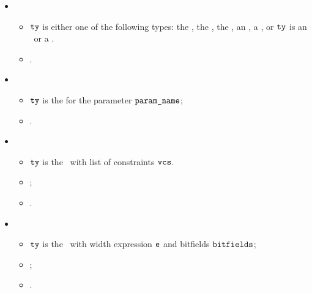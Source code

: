 \ProseParagraph
\OneApplies
\begin{itemize}
  \item {}
  \begin{itemize}
    \item $\tty$ is either one of the following types: the \realtypeterm, the \stringtypeterm,
          the \booleantypeterm, an \enumerationtypeterm, a \namedtypeterm,
          or $\tty$ is an \unconstrainedintegertypeterm\ or a
          \pendingconstrainedintegertypeterm.
    \item \Proseeqdef{$\newty$}{$\tty$}.
  \end{itemize}

  \item {}
  \begin{itemize}
    \item $\tty$ is the \parameterizedintegertypeterm{} for the parameter $\texttt{param\_name}$;
    \item {}.
  \end{itemize}

  \item {}
  \begin{itemize}
    \item $\tty$ is the \wellconstrainedintegertypeterm\ with list of constraints $\texttt{vcs}$.
    \item {};
    \item {}.
  \end{itemize}

  \item {}
  \begin{itemize}
    \item $\tty$ is the \bitvectortypeterm\ with width expression $\ve$ and bitfields $\texttt{bitfields}$;
    \item \Proserenamelocalsexpr{$\ve$}{$\vep$};
    \item {}.
  \end{itemize}


\end{itemize}
